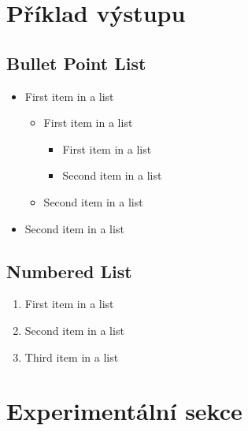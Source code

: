 \documentclass[11pt]{scrartcl} %
\begin{document}

\section{Příklad výstupu}

\subsection{Bullet Point List}

\begin{itemize}
	\item First item in a list 
		\begin{itemize}
		\item First item in a list 
			\begin{itemize}
			\item First item in a list 
			\item Second item in a list 
			\end{itemize}
		\item Second item in a list 
		\end{itemize}
	\item Second item in a list 
\end{itemize}


\subsection{Numbered List}

\begin{enumerate}
	\item First item in a list 
	\item Second item in a list 
	\item Third item in a list
\end{enumerate}


\section{Experimentální sekce}
\end{document}

